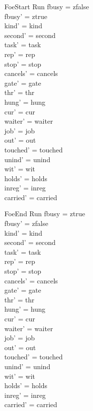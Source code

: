 \documentclass[a4paper,10pt,fleqn]{article}
\begin{document}
\begin{schema}{FoeStart}
\Delta Run
\where
fbusy = zfalse \\
fbusy' = ztrue \\
kind' = kind \\
second' = second \\
task' = task \\
rep' = rep \\
stop' = stop \\
cancels' = cancels \\
gate' = gate \\
thr' = thr \\
hung' = hung \\
cur' = cur \\
waiter' = waiter \\
job' = job \\
out' = out \\
touched' = touched \\
unind' = unind \\
wit' = wit \\
holds' = holds \\
inreg' = inreg \\
carried' = carried
\end{schema}

\begin{schema}{FoeEnd}
\Delta Run
\where
fbusy = ztrue \\
fbusy' = zfalse \\
kind' = kind \\
second' = second \\
task' = task \\
rep' = rep \\
stop' = stop \\
cancels' = cancels \\
gate' = gate \\
thr' = thr \\
hung' = hung \\
cur' = cur \\
waiter' = waiter \\
job' = job \\
out' = out \\
touched' = touched \\
unind' = unind \\
wit' = wit \\
holds' = holds \\
inreg' = inreg \\
carried' = carried
\end{schema}
\end{document}
